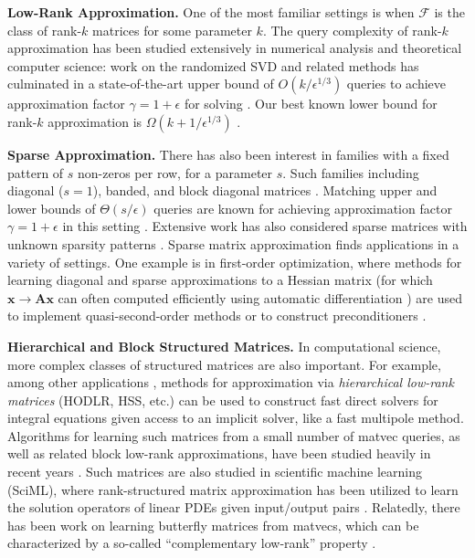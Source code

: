 \documentclass{article}[11pt]
\theoremstyle{definition}
\newcommand{\bv}[1]{\boldsymbol{\mathbf{#1}}}
\newcommand{\family}{\mathcal{F}}
\begin{document}
\smallskip \noindent \textbf{Low-Rank Approximation.}
One of the most familiar settings is when $\family$ is the class of rank-$k$ matrices for some parameter $k$. The query complexity of rank-$k$ approximation has been studied extensively in numerical analysis and theoretical computer science: work on the randomized SVD and related methods \cite{HalkoMartinssonTropp:2011,Woodruff:2014,MuscoMusco:2015} has culminated in a state-of-the-art upper bound of $O(k/\epsilon^{1/3})$ queries to achieve approximation factor $\gamma = 1+\epsilon$ for solving  \cite{BakshiClarksonWoodruff:2022,MeyerMuscoMusco:2024}. Our best known lower bound for rank-$k$ approximation is  $\Omega(k + 1/\epsilon^{1/3})$ \cite{BakshiNarayanan:2023}. 

\smallskip \noindent \textbf{Sparse Approximation.} There has also been interest in families with a fixed pattern of $s$ non-zeros per row, for a parameter $s$. Such families including diagonal ($s=1$), banded, and block diagonal matrices \cite{BekasKokiopoulouSaad:2007,TangSaad:2011,BastonNakatsukasa:2022,DharangutteMusco:2023}. Matching upper and lower bounds of $\Theta(s/\epsilon)$ queries are known for achieving approximation factor $\gamma = 1+\epsilon$ in this setting \cite{AmselChenHalikias:2024}. Extensive work has also considered sparse matrices with unknown sparsity patterns \cite{CurtisPowellReid:1974,ColemanCai:1986,ColemanMore:1983,WimalajeewaEldarVarshney:2013,SchaferOwhadi:2024,ParkNakatsukasa:2024}.  Sparse matrix approximation finds applications in a variety of settings. One example is in first-order optimization, where methods for learning diagonal and sparse approximations to a Hessian matrix (for which $\bv{x} \rightarrow \bv{A}\bv{x}$ can often computed efficiently using automatic differentiation \cite{Pearlmutter:1994}) are used to implement quasi-second-order methods or to construct preconditioners \cite{BordesBottouGallinari:2009,DauphinVriesBengio:2015,YaoGholamiKeutzer:2020}. 

\smallskip \noindent \textbf{Hierarchical and Block Structured Matrices.}
In computational science, more complex classes of structured matrices are also important. 
For example, among other applications \cite{AmbartsumyanBoukaramBui-Thanh:2020}, methods for approximation via \emph{hierarchical low-rank matrices} (HODLR, HSS, etc.) can be used to construct fast direct solvers for integral equations given access to an implicit solver, like a fast multipole method. 
Algorithms for learning such matrices from a small number of matvec queries, as well as related block low-rank approximations, have been studied heavily in recent years \cite{LinLuYing:2011,Martinsson:2016,LevittMartinsson:2024,LevittMartinsson:2024a,PearceYesypenkoLevitt:2025}. 
Such matrices are also studied in scientific machine learning (SciML), where rank-structured matrix approximation has been utilized to learn the solution operators of linear PDEs given input/output pairs \cite{BoulleTownsend:2023,BoulleHalikiasTownsend:2023,WangTownsend:2023,BoulleTownsend:2024,BoulleHalikiasOtto:2024}. Relatedly, there has been work on learning butterfly matrices from matvecs, which can be characterized by a so-called ``complementary low-rank'' property \cite{LiYangMartin:2015,LiYang:2017,LiuXingGuo:2021}.
\end{document}
